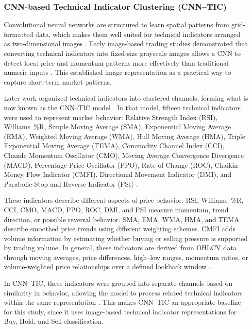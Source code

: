 \subsubsection*{CNN-based Technical Indicator Clustering (CNN--TIC)}

Convolutional neural networks are structured to learn spatial patterns from grid-formatted data, which makes them well suited for technical indicators arranged as two-dimensional images \cite{al2017understanding,lecun1995learning}. Early image-based trading studies demonstrated that converting technical indicators into fixed-size grayscale images allows a CNN to detect local price and momentum patterns more effectively than traditional numeric inputs \cite{sezer2018algorithmic}. This established image representation as a practical way to capture short-term market patterns.

Later work organized technical indicators into clustered channels, forming what is now known as the CNN--TIC model \cite{maratkhan2021deep}. In that model, fifteen technical indicators were used to represent market behavior: Relative Strength Index (RSI), Williams~\%R, Simple Moving Average (SMA), Exponential Moving Average (EMA), Weighted Moving Average (WMA), Hull Moving Average (HMA), Triple Exponential Moving Average (TEMA), Commodity Channel Index (CCI), Chande Momentum Oscillator (CMO), Moving Average Convergence Divergence (MACD), Percentage Price Oscillator (PPO), Rate of Change (ROC), Chaikin Money Flow Indicator (CMFI), Directional Movement Indicator (DMI), and Parabolic Stop and Reverse Indicator (PSI) \cite{maratkhan2021deep}.

These indicators describe different aspects of price behavior. RSI, Williams~\%R, CCI, CMO, MACD, PPO, ROC, DMI, and PSI measure momentum, trend direction, or possible reversal behavior. SMA, EMA, WMA, HMA, and TEMA describe smoothed price trends using different weighting schemes. CMFI adds volume information by estimating whether buying or selling pressure is supported by trading volume. In general, these indicators are derived from OHLCV data through moving averages, price differences, high--low ranges, momentum ratios, or volume-weighted price relationships over a defined lookback window \cite{wilder1978new,murphy1999technical,achelis2001technical}.

In CNN--TIC, these indicators were grouped into separate channels based on similarity in behavior, allowing the model to process related technical indicators within the same representation \cite{maratkhan2021deep}. This makes CNN--TIC an appropriate baseline for this study, since it uses image-based technical indicator representations for Buy, Hold, and Sell classification.

